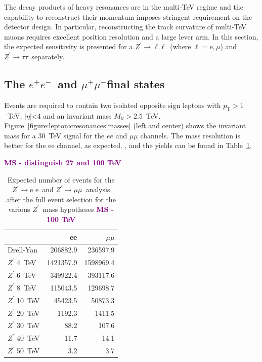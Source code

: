 \documentclass[a4paper,11pt]{article}
\newcommand{\MS}[1] {\textbf{\textcolor{purple}{MS - #1}}}
\newcommand{\Zp}{\ensuremath{Z^{\prime}}}
\newcommand*{\Zptata}{\ensuremath{Z^{\prime}\rightarrow \tau\tau}}
\newcommand*{\Zpee}{\ensuremath{Z^{\prime}\rightarrow \text{e e}}}
\newcommand*{\Zpmumu}{\ensuremath{Z^{\prime}\rightarrow \mu\mu}}
\newcommand*{\Zpll}{\ensuremath{Z^{\prime}\rightarrow \ell\ell}}
\newcommand{\pt}{\ensuremath{p_{\text{T}}}}
\newcommand{\mll}{\ensuremath{M_{\ensuremath{ll}}}}
\newcommand*{\ee}{\ensuremath{e^{+}e^{-}}}
\newcommand*{\mumu}{\ensuremath{\mu^{+}\mu^{-}}}
\begin{document}
The decay products of heavy resonances are in the multi-TeV regime and the capability to reconstruct their momentum imposes stringent requirement on the detector design. In particular, reconstructing the track curvature of multi-TeV muons requires excellent position resolution and a large lever arm. In this section, the expected sensitivity is presented for a \Zpll\ (where $\ell=\mathrm{e},\mu$) and \Zptata\ separately.


\subsection{The \ee\ and \mumu final states}
\label{sec:lepee}

Events are required to contain two isolated opposite sign leptons with $\pt > 1$~TeV, $|\eta|$<4 and an invariant mass $\mll > 2.5$~TeV.
Figure~\ref{figure:leptonicresonances:masses} (left and center) shows the invariant mass for a 30~TeV signal for the $ee$ and $\mu\mu$ channels. The mass resolution is better for the ee channel, as expected. , and the yields can be found in Table~\ref{tab:leptonicresonances:yieldsll}.

\MS{distinguish 27 and 100 TeV}

\begin{table}[htbp]
   \centering
\begin{tabular}{|l|r|r|}
  \hline
  \hline
 & ee & $\mu\mu$  \\
  \hline
  Drell-Yan & 206882.9 & 236597.9 \\
  \hline
  $\Zp$ 4~TeV & 1421357.9    & 1598969.4 \\
  $\Zp$ 6~TeV & 349922.4  & 393117.6\\
  $\Zp$ 8~TeV &   115043.5 & 129698.7 \\
  $\Zp$ 10~TeV &  45423.5 & 50873.3 \\
  $\Zp$ 20~TeV &  1192.3 & 1411.5\\
  $\Zp$ 30~TeV &  88.2 & 107.6\\
  $\Zp$ 40~TeV &  11.7 & 14.1 \\
  $\Zp$ 50~TeV &  3.2 & 3.7\\
  \hline
  \hline
\end{tabular}
  \caption{Expected number of events for the \Zpee\ and \Zpmumu\ analysis after the full event selection for the various \Zp\ mass hypotheses \MS{100 TeV}}
  \label{tab:leptonicresonances:yieldsll}
\end{table}
\end{document}
